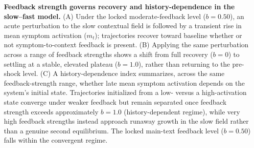 %

\caption{\textbf{Feedback strength governs recovery and history-dependence in the slow--fast model.}
(A) Under the locked moderate-feedback level (\(b = 0.50\)), an acute perturbation to the slow contextual field is followed by a transient rise in mean symptom activation (\(m_t\)); trajectories recover toward baseline whether or not symptom-to-context feedback is present.
(B) Applying the same perturbation across a range of feedback strengths shows a shift from full recovery (\(b = 0\)) to settling at a stable, elevated plateau (\(b = 1.0\)), rather than returning to the pre-shock level.
(C) A history-dependence index summarizes, across the same feedback-strength range, whether late mean symptom activation depends on the system's initial state. Trajectories initialized from a low- versus a high-activation state converge under weaker feedback but remain separated once feedback strength exceeds approximately \(b = 1.0\) (history-dependent regime), while very high feedback strengths instead approach runaway growth in the slow field rather than a genuine second equilibrium. The locked main-text feedback level (\(b = 0.50\)) falls within the convergent regime.}
